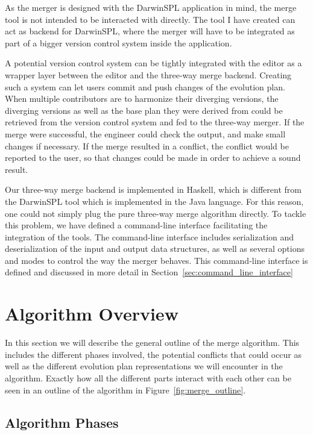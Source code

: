 \documentclass[a4paper,english]{ifimaster}
\begin{document}
As the merger is designed with the DarwinSPL application in mind, the merge tool is not intended to be interacted with directly. The tool I have created can act as backend for DarwinSPL, where the merger will have to be integrated as part of a bigger version control system inside the application.

A potential version control system can be tightly integrated with the editor as a wrapper layer between the editor and the three-way merge backend. Creating such a system can let users commit and push changes of the evolution plan. When multiple contributors are to harmonize their diverging versions, the diverging versions as well as the base plan they were derived from could be retrieved from the version control system and fed to the three-way merger. If the merge were successful, the engineer could check the output, and make small changes if necessary. If the merge resulted in a conflict, the conflict would be reported to the user, so that changes could be made in order to achieve a sound result.

Our three-way merge backend is implemented in Haskell, which is different from the DarwinSPL tool which is implemented in the Java language. For this reason, one could not simply plug the pure three-way merge algorithm directly. To tackle this problem, we have defined a command-line interface facilitating the integration of the tools. The command-line interface includes serialization and deserialization of the input and output data structures, as well as several options and modes to control the way the merger behaves. This command-line interface is defined and discussed in more detail in Section~\vref{sec:command_line_interface}

\section{Algorithm Overview}%
\label{sec:algorithm_overview}

In this section we will describe the general outline of the merge algorithm. This includes the different phases involved, the potential conflicts that could occur as well as the different evolution plan representations we will encounter in the algorithm. Exactly how all the different parts interact with each other can be seen in an outline of the algorithm in Figure~\vref{fig:merge_outline}.

\subsection{Algorithm Phases}%
\label{sub:algorithm_phases}
\end{document}
